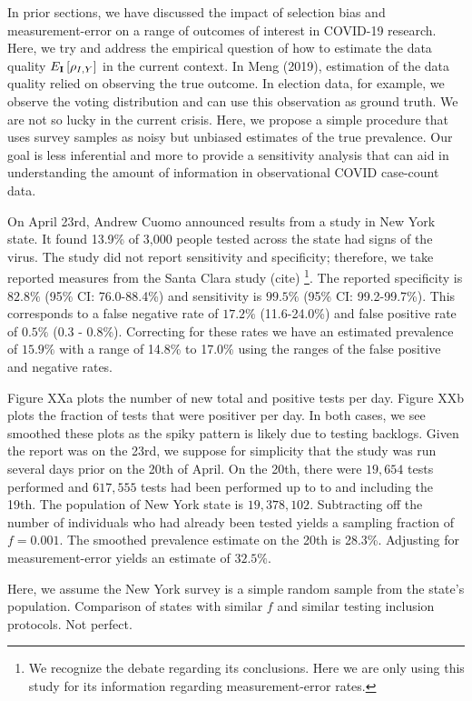 \documentclass[aoas]{amsart}
\def\I{\bf I}
\begin{document}
In prior sections, we have discussed the impact of selection bias and measurement-error on a range of outcomes of interest in COVID-19 research.  Here, we try and address the empirical question of how to estimate the data quality $E_{\I} \left[ \rho_{I,Y} \right]$ in the current context.
In Meng (2019), estimation of the data quality relied on observing the true outcome.  In election data, for example, we observe the voting distribution and can use this observation as ground truth.  We are not so lucky in the current crisis.  Here, we propose a simple procedure that uses survey samples as noisy but unbiased estimates of the true prevalence. Our goal is less inferential and more to provide a sensitivity analysis that can aid in understanding the amount of information in observational COVID case-count data.

On April 23rd, Andrew Cuomo announced results from a study in New York state.  It found 13.9\% of 3,000 people tested across the state had signs of the virus.  The study did not report sensitivity and specificity; therefore, we take reported measures from the Santa Clara study (cite) \footnote{We recognize the debate regarding its conclusions.  Here we are only using this study for its information regarding measurement-error rates.}.  The reported specificity is $82.8\%$ (95\% CI: 76.0-88.4\%) and sensitivity is $99.5\%$ (95\% CI: 99.2-99.7\%).  This corresponds to a false negative rate of $17.2\%$ (11.6-24.0\%) and false positive rate of $0.5\%$ (0.3 - 0.8\%).  Correcting for these rates we have an estimated prevalence of $15.9\%$ with a range of 14.8\% to 17.0\% using the ranges of the false positive and negative rates.

Figure XXa plots the number of new total and positive tests per day.  Figure XXb plots the fraction of tests that were positiver per day.  In both cases, we see smoothed these plots as the spiky pattern is likely due to testing backlogs.  Given the report was on the 23rd, we suppose for simplicity that the study was run several days prior on the 20th of April. On the 20th, there were $19,654$ tests performed and $617,555$ tests had been performed up to to and including the 19th. The population of New York state is $19,378,102$.   Subtracting off the number of individuals who had already been tested yields a sampling fraction of $f = 0.001$.  The smoothed prevalence estimate on the 20th is 28.3\%.  Adjusting for measurement-error yields an estimate of $32.5\%$.

Here, we assume the New York survey is a simple random sample from the state's population.
Comparison of states with similar $f$ and similar testing inclusion protocols.  Not perfect.
\end{document}
